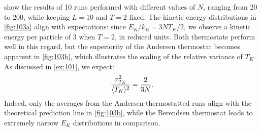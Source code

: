  show the results of \num{10} runs performed with
different values of $N$, ranging from \num{20} to \num{200}, while keeping $L =
\num{10}$ and $T = \num{2}$ fixed. The kinetic energy distributions in
\cref{fig:103a} align with expectations: since $E_{K} / k_{\mathrm{B}} = 3 N
T_{K} / 2$, we observe a kinetic energy per particle of \num{3} when $T =
\num{2}$, in reduced units. Both thermostats perform well in this regard, but
the superiority of the Andersen thermostat becomes apparent in \cref{fig:103b},
which illustrates the scaling of the relative variance of $T_{K}$. As discussed
in \cref{ex:101}, we expect:
\begin{equation}
  \frac{\sigma_{T_{K}}^{2}}{\langle T_{K}\rangle^{2}} = \frac{2}{3N}.
\end{equation}
Indeed, only the averages from the Andersen-thermostatted runs align with the
theoretical prediction line in \cref{fig:103b}, while the Berendsen thermostat
leads to extremely narrow $E_{K}$ distributions in comparison.
